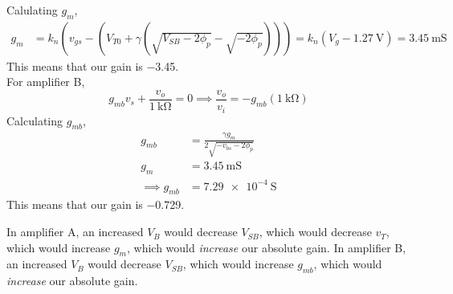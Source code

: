 \documentclass{article}
\begin{document}
\begin{subparts}
\begin{equation}
  \end{equation}
  Calulating \(g_{m}\),
  \begin{align}
    g_{m} &= k_{n} \left(v_{gs} - \left(V_{T0} + \gamma \left(\sqrt{V_{SB} - 2 \phi_{p}} - \sqrt{-2\phi_{p}}\right)\right)\right) = k_{n} \left(V_{g} - \qty{1.27}{\volt}\right) = \qty{3.45}{\milli\siemens}
  \end{align}
  This means that our gain is \num{-3.45}. \\
  For amplifier B,
  \begin{equation}
    g_{mb} v_{s} + \frac{v_{o}}{\qty{1}{\kilo\ohm}} = 0 \implies \frac{v_{o}}{v_{i}} = -g_{mb} (\qty{1}{\kilo\ohm})
  \end{equation}
  Calculating \(g_{mb}\),
  \begin{align}
    g_{mb} &= \frac{\gamma g_{m}}{2 \sqrt{-v_{bs} - 2\phi_{p}}} \\
    g_{m} &= \qty{3.45}{\milli\siemens} \\
    \implies g_{mb} &= \qty{7.29e-4}{\siemens}
  \end{align}
  This means that our gain is \num{-0.729}.
  \item In amplifier A, an increased \(V_{B}\) would decrease \(V_{SB}\), which would decrease \(v_{T}\), which would increase \(g_{m}\), which would \emph{increase} our absolute gain.
  In amplifier B, an increased \(V_{B}\) would decrease \(V_{SB}\), which would increase \(g_{mb}\), which would \emph{increase} our absolute gain.
\end{subparts}

\question{}
\end{document}
